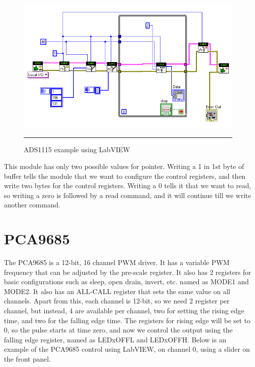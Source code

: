 \begin{figure}[htbp]
	\centering
		\includegraphics[width = 5in]{./Figures/ADS-1115.png}
		\rule{35em}{0.5pt}
	\caption{ADS1115 example using LabVIEW}
	\label{fig:ADS1115 example using LabVIEW}
\end{figure}

This module has only two possible values for pointer. Writing a 1 in 1st byte of buffer tells the module that we want to configure the control registers, and then write two bytes for the control registers. Writing a 0 tells it that we want to read, so writing a zero is followed by a read command, and it will continue till we write another command. 

\section{PCA9685}
The PCA9685 is a 12-bit, 16 channel PWM driver.	It has a variable PWM frequency that can be adjusted by the pre-scale register. It also has 2 registers for basic configurations such as sleep, open drain, invert, etc. named as MODE1 and MODE2. It also has an ALL-CALL register that sets the same value on all channels. Apart from this, each channel is 12-bit, so we need 2 register per channel, but instead, 4 are available per channel, two for setting the rising edge time, and two for the falling edge time. The registers for rising edge will be set to 0, so the pulse starts at time zero, and now we control the output using the falling edge register, named as LEDx\textunderscore OFF\textunderscore L and LEDx\textunderscore OFF\textunderscore H. Below is an example of the PCA9685 control using LabVIEW, on channel 0, using a slider on the front panel.

